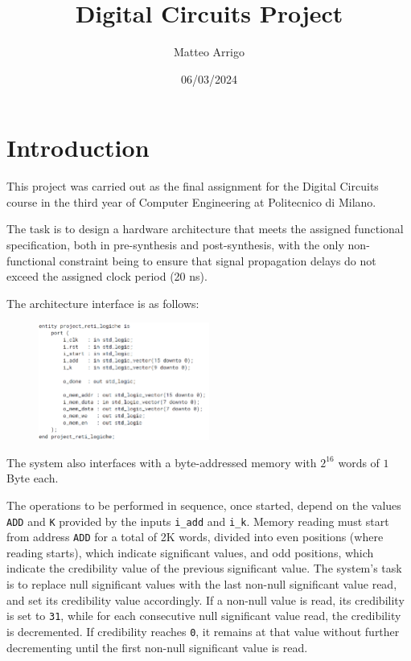 \documentclass{article}
\title{Digital Circuits Project}
\author{Matteo Arrigo}
\date{06/03/2024} %
\begin{document}
\maketitle

\section{Introduction}

This project was carried out as the final assignment for the Digital Circuits course in the third year of Computer Engineering at Politecnico di Milano.

The task is to design a hardware architecture that meets the assigned functional specification, both in pre-synthesis and post-synthesis, with the only non-functional constraint being to ensure that signal propagation delays do not exceed the assigned clock period (20 ns).

The architecture interface is as follows:

\begin{figure}[h]
    \centering
    \includegraphics[width=0.5\textwidth]{specifica.png}
    \label{fig:Functional specification - Architecture interface}
\end{figure}

The system also interfaces with a byte-addressed memory with $2^{16}$ words of \(1\) Byte each.

The operations to be performed in sequence, once started, depend on the values \texttt{ADD} and \texttt{K} provided by the inputs \texttt{i\_add} and \texttt{i\_k}. Memory reading must start from address \texttt{ADD} for a total of 2K words, divided into even positions (where reading starts), which indicate significant values, and odd positions, which indicate the credibility value of the previous significant value. The system's task is to replace null significant values with the last non-null significant value read, and set its credibility value accordingly. If a non-null value is read, its credibility is set to \texttt{31}, while for each consecutive null significant value read, the credibility is decremented. If credibility reaches \texttt{0}, it remains at that value without further decrementing until the first non-null significant value is read.
\end{document}
